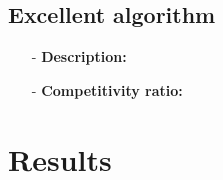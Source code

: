 \documentclass{article}
\begin{document}
\subsection{Excellent algorithm}
\begin{itemize}
    \item[-] \textbf{Description:}
    
    \item[-] \textbf{Competitivity ratio:}
\end{itemize}
\section{Results}
\end{document}
